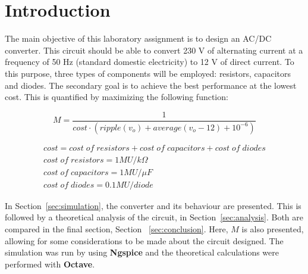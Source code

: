\newpage

\section{Introduction}
\label{sec:introduction}


The main objective of this laboratory assignment is to design an AC/DC converter. This circuit should be able to convert 230 V of alternating current at a frequency of 50 Hz (standard domestic electricity) to 12 V of direct current. To this purpose, three types of components will be employed: resistors, capacitors and diodes. The secondary goal is to achieve the best performance at the lowest cost. This is quantified by maximizing the following function:

\begin{equation}
  M = \frac{1}{cost \cdot (ripple(v_o) + average(v_o-12) + 10^{-6})}
\end{equation}

\begin{gather*}
  cost = cost\;of\;resistors + cost\;of\;capacitors + cost\;of\;diodes \\
  cost\;of\;resistors = 1 MU/k\Omega \\
  cost\;of\;capacitors = 1 MU/\mu F \\
  cost\;of\;diodes = 0.1 MU/diode
\end{gather*}

In Section~\ref{sec:simulation}, the converter and its behaviour are presented. This is followed by a theoretical analysis of the circuit, in Section~\ref{sec:analysis}. Both are compared in the final section, Section ~\ref{sec:conclusion}. Here, $M$ is also presented, allowing for some considerations to be made about the circuit designed. The simulation was run by using {\bf Ngspice} and the theoretical calculations were performed with {\bf Octave}.

